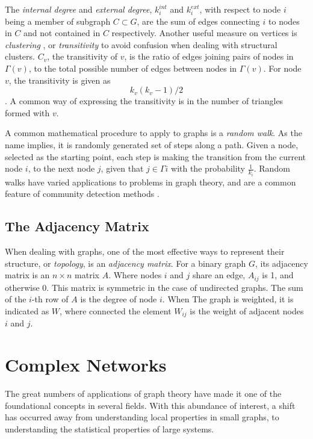 The \textit{internal degree} and \textit{external degree}, $k^{int}_i$ and $k^{ext}_i$, with respect to node $i$ being a member of subgraph $C\subset G$, are the sum of edges connecting $i$ to nodes in $C$ and not contained in $C$ respectively. 
Another useful measure on vertices is \textit{clustering} \cite{Watts1998}, or \textit{transitivity} to avoid confusion when dealing with structural clusters. $C_v$, the transitivity of $v$, is the ratio of edges joining pairs of nodes in $\Gamma(v)$, to the total possible number of edges between nodes in $\Gamma(v)$. For node $v$, the transitivity is given as $$k_v(k_v-1)/2$$. A common way of expressing the transitivity is in the number of triangles formed with $v$.



A common mathematical procedure to apply to graphs is a \textit{random walk}. As the name implies, it is  randomly generated set of steps along a path. Given a node, selected as the starting point, each step is making the transition from the current node $i$, to the next node $j$, given that $j\in\Gamma{i}$ with the probability $\frac{1}{k_i}$. Random walks have varied applications to problems in graph theory, and are a common feature of community detection methods \cite{Pons2006}.




\subsection{The Adjacency Matrix}
When dealing with graphs, one of the most effective ways to represent their structure, or \textit{topology}, is an \textit{adjacency matrix}. For a binary graph $G$, its adjacency matrix is an $n\times n$ matrix $A$. Where nodes $i$ and $j$ share an edge, $A_{ij}$ is 1, and otherwise 0. This matrix is symmetric in the case of undirected graphs. The sum of the $i$-th row of $A$ is the degree of node $i$.
When The graph is weighted, it is indicated as $W$, where connected the element $W_{ij}$ is the weight of adjacent nodes $i$ and $j$.

\section{Complex Networks}
The great numbers of applications of graph theory have made it one of the foundational concepts in several fields. With this abundance of interest, a shift has occurred away from understanding local properties in small graphs, to understanding the statistical properties of large systems. 

